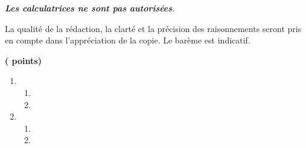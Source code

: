 \documentclass[12pt,french]{book}
\begin{document}
\thispagestyle{garde}

\medskip




\begin{spacing}{1.2} %


\begin{center}
\begin{minipage}{0.8\linewidth}
\begin{center}
\itshape
\textbf{Les calculatrices ne sont pas autorisées}.\par
La qualité de la rédaction, la clarté et la précision des raisonnements seront pris en compte dans l'appréciation de la copie.
Le barème est indicatif.
\end{center}
\end{minipage}
\end{center}

\noindent


\medskip\exercice \hfill \textbf{( points)} \par
\begin{enumerate}[label=\arabic*.]
\item 
	\begin{enumerate}[label=\alph*)]
		
	\item 

		
	\item
	
	\end{enumerate}

\item 
\begin{enumerate}[label=\alph*)]
	\item 
	
	\item 
	

\end{enumerate}
\end{enumerate}
\end{spacing}
\end{document}
